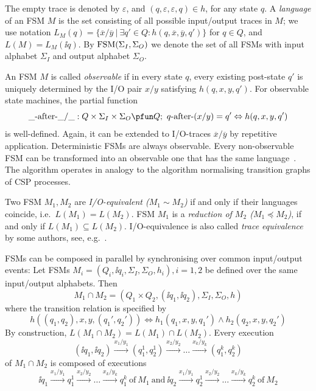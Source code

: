 The empty trace is denoted by $\varepsilon$, and
$(q,\varepsilon,\varepsilon,q)\in h$, for any state $q$.
A \emph{language}  of an FSM $M$  is the set consisting of all possible input/output
traces in $M$; we use notation
 $L_M(q)=\{\overline{x}/\overline{y}~|~\exists q'\in Q: h(q,\overline{x},\overline{y},q')\}$ for $q\in Q$, and  $L(M)=L_M(\ii{q})$.
By $\text{FSM}(\Sigma_I,\Sigma_O)$ we denote the set of all FSMs with input alphabet $\Sigma_I$ and
output alphabet $\Sigma_O$.

An FSM $M$ is called \emph{observable} if in every state $q$, every existing post-state $q'$ is uniquely determined by the I/O pair $x/y$ satisfying $h(q,x,y,q')$. For
observable state machines, the partial function
$$
\_ \after\_ /\_ : Q\times\Sigma_I\times \Sigma_O \pfun Q;\
q\after(x/y) = q' \Leftrightarrow h(q,x,y,q')
$$
is well-defined. Again, it can be extended to I/O-traces $\overline x/\overline y$
by repetitive application.
Deterministic FSMs are always observable. Every non-observable FSM can be transformed into an observable one that has the same language~\cite{PeleskaHuangLectureNotesMBT}. The algorithm
operates in analogy to the algorithm normalising transition graphs of CSP processes.

Two FSM $M_1, M_2$ are \emph{I/O-equivalent ($M_1\sim M_2$)} if and only if their languages coincide, i.e.~$L(M_1) = L(M_2)$. FSM $M_1$ is a \emph{reduction of $M_2$ ($M_1 \preceq M_2$)},
if and only if $L(M_1) \subseteq L(M_2)$. I/O-equivalence is also called
\emph{trace equivalence} by some authors, see, e.g.~\cite{luo_test_1994}.



FSMs can be composed in parallel by synchronising over common input/output events:
Let FSMs $M_i=(Q_i, \ii{q_i}, \Sigma_I, \Sigma_O,  h_i), i = 1,2$ be defined over
the same input/output alphabets. Then
$$
M_1 \cap M_2 = (Q_1\times Q_2, (\ii{q_1},\ii{q_2}),\Sigma_I, \Sigma_O, h)
$$
where the transition relation is specified by
$$
h((q_1,q_2),x,y,(q_1',q_2')) \Leftrightarrow h_1(q_1,x,y,q_1') \wedge h_2(q_2,x,y,q_2')
$$
By construction, $L(M_1 \cap M_2) = L(M_1) \cap L(M_2)$. Every execution
$$
(\ii{q_1},\ii{q_2}) \xrightarrow{x_1/y_1} (q_1^1,q_2^1)
\xrightarrow{x_2/y_2} \dots \xrightarrow{x_k/y_k} (q_1^{k},q_2^{k})
$$
of
$M_1\cap M_2$
is composed of executions
$$
\ii{q_1} \xrightarrow{x_1/y_1} q_1^1
\xrightarrow{x_2/y_2} \dots \xrightarrow{x_k/y_k} q_1^{k}\
\text{of}\ M_1\ \text{and}\
\ii{q_2} \xrightarrow{x_1/y_1} q_2^1
\xrightarrow{x_2/y_2} \dots \xrightarrow{x_k/y_k} q_2^{k}\
\text{of}\ M_2
$$
